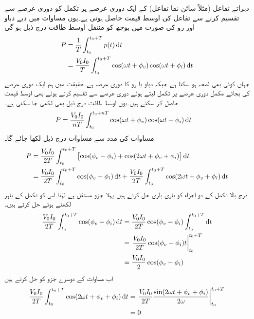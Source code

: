 دہراتے تفاعل (مثلاً سائن نما تفاعل) کے ایک دوری عرصے پر تکمل کو دوری عرصے سے تقسیم کرنے سے تفاعل کی اوسط قیمت حاصل ہوتی ہے۔یوں مساوات  میں دیے دباو اور رو کی صورت میں بوجھ کو منتقل اوسط طاقت درج ذیل ہو گی
\begin{gather}
\begin{aligned}\label{مساوات_طاقت_اوسط_تکمل_الف}
P&=\frac{1}{T}\int_{t_0}^{t_0+T} p(t) \dif t\\
&=\frac{V_0 I_0}{T}\int_{t_0}^{t_0+T} \cos(\omega t +\phi_v) \cos(\omega t +\phi_i) \dif t
\end{aligned}
\end{gather}    
جہاں  کوئی بھی لمحہ ہو سکتا ہے جبکہ  دباو یا رو کا دوری عرصہ ہے۔حقیقت میں ہم ایک دوری عرصے کی بجائے   مکمل دوری عرصے پر تکمل لیتے ہوئے  دوری عرصے سے تقسیم کرتے ہوئے بھی اوسط قیمت حاصل کر سکتے ہیں۔یوں اوسط طاقت درج ذیل بھی لکھی جا سکتی ہے۔
\begin{align}
P&=\frac{V_0 I_0}{nT}\int_{t_0}^{t_0+nT} \cos(\omega t +\phi_v) \cos(\omega t +\phi_i) \dif t
\end{align} 
مساوات  کی مدد سے مساوات  درج ذیل لکھا جائے گا۔
\begin{gather}
\begin{aligned}\label{مساوات_طاقت_اوسط_تکمل_ب}
P&=\frac{V_0 I_0}{2T}\int_{t_0}^{t_0+T} \left[\cos(\phi_v-\phi_i)+\cos(2\omega t +\phi_v+\phi_i)\right] \dif t\\
&=\frac{V_0 I_0}{2T}\int_{t_0}^{t_0+T} \cos(\phi_v-\phi_i) \dif t+\frac{V_0 I_0}{2T}\int_{t_0}^{t_0+T} \cos(2\omega t +\phi_v+\phi_i)\dif t
\end{aligned}
\end{gather} 
درج بالا تکمل کے دو اجزاء کو باری باری حل کرتے ہیں۔پہلا جزو مستقل ہے لہٰذا اس کو تکمل کے باہر لکھتے ہوئے حل کرتے ہیں۔
\begin{align*}
\frac{V_0 I_0}{2T}\int_{t_0}^{t_0+T} \cos(\phi_v-\phi_i) \dif t&=\frac{V_0 I_0}{2T}\cos(\phi_v-\phi_i) \int_{t_0}^{t_0+T} \dif t\\
&=\left. \frac{V_0 I_0}{2T}\cos(\phi_v-\phi_i) t\right|_{t_0}^{t_0+T}\\
&=\frac{V_0 I_0}{2}\cos(\phi_v-\phi_i)
\end{align*}
اب مساوات  کے دوسرے جزو کو حل کرتے ہیں
\begin{align*}
\frac{V_0 I_0}{2T}\int_{t_0}^{t_0+T} \cos(2\omega t +\phi_v+\phi_i)\dif t&=\left. \frac{V_0 I_0}{2T}\frac{ \sin(2\omega t +\phi_v+\phi_i)}{2\omega}\right|_{t_0}^{t_0+T}\\
&=0
\end{align*}

